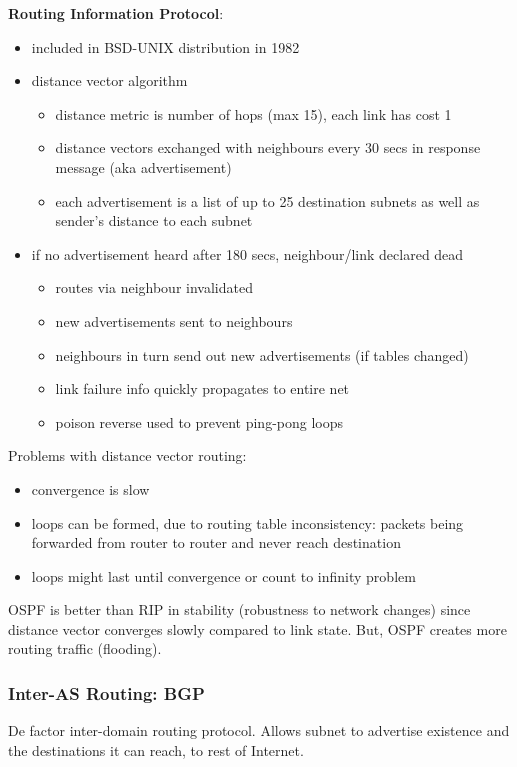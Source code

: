 \documentclass[11pt]{article}
\begin{document}
\textbf{Routing Information Protocol}:
\begin{itemize}
\item included in BSD-UNIX distribution in 1982
\item distance vector algorithm
\begin{itemize}
\item distance metric is number of hops (max 15), each link has cost 1
\item distance vectors exchanged with neighbours every 30 secs in response message (aka
advertisement)
\item each advertisement is a list of up to 25 destination subnets as well as sender's distance
to each subnet
\end{itemize}
\item if no advertisement heard after 180 secs, neighbour/link declared dead
\begin{itemize}
\item routes via neighbour invalidated
\item new advertisements sent to neighbours
\item neighbours in turn send out new advertisements (if tables changed)
\item link failure info quickly propagates to entire net
\item poison reverse used to prevent ping-pong loops
\end{itemize}
\end{itemize}

Problems with distance vector routing:
\begin{itemize}
\item convergence is slow
\item loops can be formed, due to routing table inconsistency: packets being forwarded from router to
router and never reach destination
\item loops might last until convergence or count to infinity problem
\end{itemize}

OSPF is better than RIP in stability (robustness to network changes) since distance vector converges
slowly compared to link state.
But, OSPF creates more routing traffic (flooding).
\subsubsection{Inter-AS Routing: BGP}
\label{sec:org428959e}
De factor inter-domain routing protocol.
Allows subnet to advertise existence and the destinations it can reach, to rest of Internet.
\end{document}
